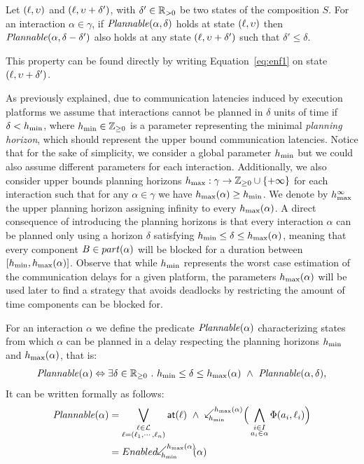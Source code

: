 \begin{property}\label{pt:plnIn2}
Let $(\ell,\upsilon)$ and $(\ell,\upsilon+\delta')$, with $\delta'\in\mathbb{R}_{> 0}$ be two states of 
the composition $S$. For an interaction $\alpha\in\gamma$, if $\mathit{Plannable(\alpha,\delta)}$ 
holds at state $(\ell,\upsilon)$ then $\mathit{Plannable(\alpha,\delta-\delta')}$ 
also holds at any state $(\ell,\upsilon+\delta')$ such that $\delta'\le\delta$.
\end{property}
This property can be found directly by writing Equation~\ref{eq:enf1} on state 
$(\ell,\upsilon+\delta')$.

As previously explained, due to communication latencies induced by execution platforms 
we assume that interactions cannot be planned in $\delta$ units of time if $\delta < h_{\min}$, 
where $h_{\min} \in \mathbb{Z}_{\ge 0}$ is a parameter representing the minimal \emph{planning horizon}, 
which should represent the upper bound communication latencies.
Notice that for the sake of simplicity, we consider a global parameter $h_{\min}$ but 
we could also assume different parameters for each interaction.
Additionally, we also consider upper bounds planning horizons 
$h_{\max} : \gamma \to \mathbb{Z}_{\ge 0}\cup\{ +\infty \}$ 
for each interaction such that for any $\alpha\in\gamma$ we have $h_{\max}(\alpha) \geq h_{\min}$.
We denote by $h_{\max}^{\infty}$ the upper planning horizon assigning infinity to every $h_{\max}(\alpha)$.
A direct consequence of introducing the planning horizons is that every interaction $\alpha$ 
can be planned only using a horizon $\delta$ satisfying $h_{\min} \leq \delta \leq h_{\max}(\alpha)$,
meaning that every component $B\in part(\alpha)$ will be blocked for a duration between
$[h_{\min},h_{\max}(\alpha)]$. Observe that while $h_{\min}$ represents the worst case estimation of the 
communication delays for a given platform, the parameters $h_{\max}(\alpha)$ will be used later 
to find a strategy that avoids deadlocks by restricting the amount of time components 
can be blocked for.

For an interaction $\alpha$ we define the predicate $\mathit{Plannable(\alpha)}$ 
characterizing states from which $\alpha$ can be planned in a delay respecting 
the planning horizons $h_{\min}$ and $h_{\max}(\alpha)$, that is:
\begin{displaymath}
\plntxt{\alpha}\Leftrightarrow\exists\delta\in\realpoz\ .\ \hmin\leq\delta\leq\hmax(\alpha)\ 
  \wedge\ \plnIntxt{\alpha}{\delta},
\end{displaymath}
It can be written formally as follows:
\begin{align}\label{eq:pln}
 \plntxt{\alpha}&=\bigvee_{\substack{\loc\in\Loc\\\loc=(\loc_1,\cdots,\loc_n)}}\al{\loc}\ \wedge\
  \backwardp{\hmin}{\hmx} \Big(\bigwedge_{\substack{i\in I\\a_i\in\alpha}}\Phi(a_i,\loc_i)\Big)\\
                &=\enabledbackwardb{\alpha}{\hmin}{\hmx}
\end{align}

